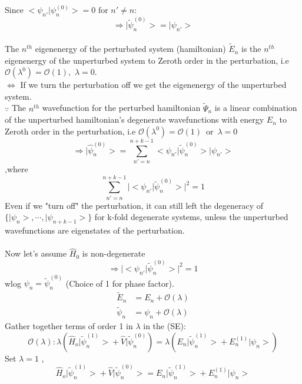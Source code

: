 \documentclass[12pt]{article}
\begin{document}
Since $ \big< \psi_{n'} \big| \psi_n^{(0)} \big> = 0\,\,\text{for }n'\neq n$:
$$\Longrightarrow \big| \tilde{\psi}^{(0)}_n \big > = \big| \psi_{n'} \big>$$
\\
The $n^{th}$ eigenenergy of the perturbated system (hamiltonian) $\tilde{E}_n$ is the $n^{th}$ 
eigenenergy of the unperturbed system to Zeroth order in the perturbation, i.e $\mathcal{O}(\lambda^0)
= \mathcal{O}(1),\,\,\lambda = 0 $.
\\
$\Longleftrightarrow$ If we turn the perturbation off we get the eigenenergy of the unperturbed system.
\\
$\because$ The $n^{th}$ wavefunction for the perturbed hamiltonian $\tilde{\Psi}_n$ is a linear 
combination of the unperturbed hamiltonian's degenerate wavefunctions with energy $E_n$ to Zeroth
order in the perturbation, i.e $\mathcal{O}(\lambda^0) = \mathcal{O}(1)\,\,\,\text{or}\,\,\,\lambda = 0$ 
\begin{equation*}
	\Longrightarrow \big|\hat{\psi}^{(0)}_n \big> =\sum_{n'=n}^{n+k-1}
	\big< \psi_{n'} \big|\tilde{ \psi}_n^{(0)} \big> \big|\psi_{n'}\big>
\end{equation*}
,where
$$\sum_{n'=n}^{n+k-1}\big| \big< \psi_{n'} \big| \tilde{\psi}_n^{(0)} \big> \big|^2 = 1$$
Even if we "turn off" the perturbation, it can still left the degeneracy of $\{\big|\psi_n\big>,
\cdots, \big|\psi_{n+k-1}\big>\}$ for k-fold degenerate systems, unless the unperturbed wavefunctions
are eigenstates of the perturbation.\\
\\
Now let's assume $\hat{H}_0$ is non-degenerate
$$\Longrightarrow \big| \big< \psi_{n'} \big| \tilde{\psi}_n^{(0)} \big> \big|^2 = 1$$
wlog $\psi_n = \tilde{\psi}^{(0)}_n$ (Choice of 1 for phase factor).
\begin{align*}
	\tilde{E}_n & = E_n + \mathcal{O}(\lambda)\\
	\tilde{\psi}_n & = \psi_n + \mathcal{O}(\lambda)
\end{align*}
Gather together terms of order 1 in $\lambda$ in the (SE):
\begin{equation}
	\mathcal{O}(\lambda):\lambda \left( \hat{H}_o \big|\tilde{\psi}^{(1)}_n \big> + 
	\hat{V}\big| \tilde{\psi}^{(0)}_n \right) = 
	\lambda \left(E_n \big|\tilde{\psi}^{(1)}_n \big> + E^{(1)}_n \big|\psi_n \big> \right)
\end{equation}
Set $\lambda = 1$
, 
\begin{equation}
	\hat{H}_o \big|\tilde{\psi}^{(1)}_n \big> + 
	\hat{V}\big| \tilde{\psi}^{(0)}_n \big> = 
	E_n \big|\tilde{\psi}^{(1)}_n \big> + E^{(1)}_n \big|\psi_n \big> 
\end{equation}
\end{document}
